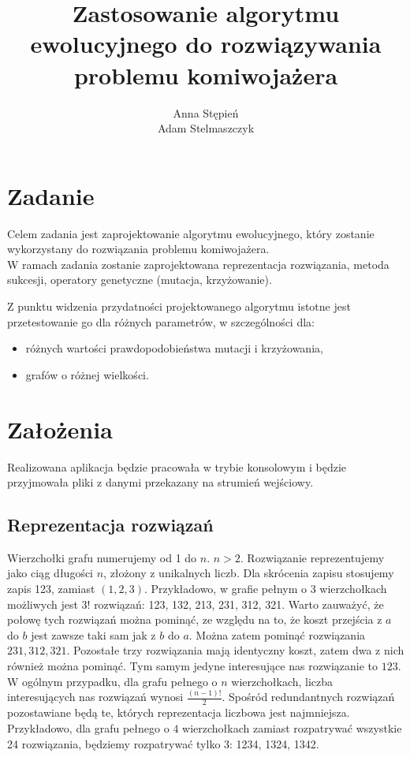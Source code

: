 \documentclass[12pt, a4paper]{article}
\title{\textbf{Zastosowanie algorytmu ewolucyjnego do rozwiązywania problemu komiwojażera}}
\author{Anna Stępień \\ Adam Stelmaszczyk}
\date{}
\begin{document}
\maketitle

\section{Zadanie}
Celem zadania jest zaprojektowanie algorytmu ewolucyjnego, który zostanie wykorzystany do rozwiązania problemu komiwojażera. \\

W ramach zadania zostanie zaprojektowana reprezentacja rozwiązania, metoda sukcesji, operatory genetyczne (mutacja, krzyżowanie).

Z punktu widzenia przydatności projektowanego algorytmu istotne jest przetestowanie go dla różnych parametrów, w szczególności dla:
\begin{itemize}
	\item różnych wartości prawdopodobieństwa mutacji i krzyżowania,
	\item grafów o różnej wielkości.
\end{itemize}

\section{Założenia}
Realizowana aplikacja będzie pracowała w trybie konsolowym i będzie przyjmowała
pliki z danymi przekazany na strumień wejściowy.

\subsection{Reprezentacja rozwiązań}

Wierzchołki grafu numerujemy od 1 do $n$. $n > 2$. Rozwiązanie reprezentujemy jako ciąg długości $n$, złożony z unikalnych liczb. 
Dla skrócenia zapisu stosujemy zapis 123, zamiast $(1,2,3)$. Przykładowo, w grafie pełnym o 3 wierzchołkach możliwych jest $3!$ rozwiązań: 123, 132, 213, 231, 312, 321.
Warto zauważyć, że połowę tych rozwiązań można pominąć, ze względu na to, że koszt przejścia z $a$ do $b$ jest zawsze 
taki sam jak z $b$ do $a$. Można zatem pominąć rozwiązania $231, 312, 321$. Pozostałe trzy rozwiązania mają identyczny koszt,
zatem dwa z nich również można pominąć. Tym samym jedyne interesujące nas rozwiązanie to $123$. W ogólnym przypadku, dla grafu pełnego
o $n$ wierzchołkach, liczba interesujących nas rozwiązań wynosi $\frac{(n-1)!}{2}$. Spośród redundantnych rozwiązań pozostawiane będą te,
których reprezentacja liczbowa jest najmniejsza. Przykładowo, dla grafu pełnego o $4$ wierzchołkach zamiast rozpatrywać wszystkie
24 rozwiązania, będziemy rozpatrywać tylko 3: 1234, 1324, 1342.
\end{document}
